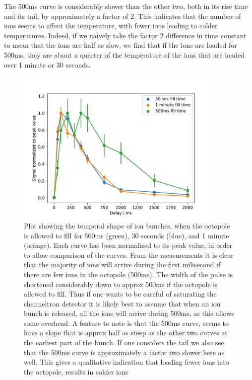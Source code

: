 The 500ms curve is considerably slower than the other two, both in its rise time and its tail, by approximately a factor of 2. This indicates that the number of ions seems to affect the temperature, with fewer ions leading to colder temperatures.
Indeed, if we naively take the factor 2 difference in time constant to mean that the ions are half as slow, we find that if the ions are loaded for 500ms, they are about a quarter 
of the temperature of the ions that are loaded over 1 minute or 30 seconds.
\begin{figure}[h]
    \centering
    \includegraphics[width = 0.9\textwidth]{main/chargeShape.pdf}
    \caption{Plot showing the temporal shape of ion bunches, when the octopole is allowed to fill for 500ms (green), 30 seconds (blue), and 1 minute (orange).
    Each curve has been normalized to its peak value, in order to allow comparison of the curves. From the measurements it is clear that the majority of ions will arrive during the first milisecond if there are few ions in the octopole (500ms).
    The width of the pulse is shortened considerably down to approx 500ms if the octopole is allowed to fill. Thus if one wants to be careful of saturating the channeltron detector it is likely best to assume that when an ion bunch is released, all the ions will arrive during 500ms, as this allows some overhead.
    A feature to note is that the 500ms curve, seems to have a slope that is approx half as steep as the other two curves at the earliest part of the bunch.
    If one considers the tail we also see that the 500ms curve is approximately a factor two slower here as well. This gives a qualitative indication that loading fewer ions into the octopole, results in colder ions}
    \label{fig:bunchShape}
\end{figure}

